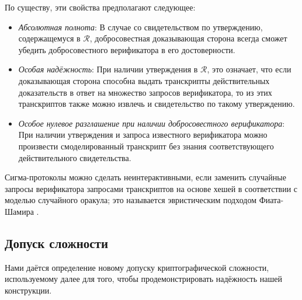 \documentclass{article}
\theoremstyle{definition}
\begin{document}
По существу, эти свойства предполагают следующее:
\begin{itemize}
\item \textit{Абсолютная полнота}: В случае со свидетельством по утверждению, содержащемуся в $\mathcal{R}$, добросовестная доказывающая сторона всегда сможет убедить добросовестного верификатора в его достоверности.
\item \textit{Особая надёжность}: При наличии утверждения в $\mathcal{R}$, это означает, что если доказывающая сторона способна выдать транскрипты действительных доказательств в ответ на множество запросов верификатора, то из этих транскриптов также можно извлечь и свидетельство по такому утверждению.
\item \textit{Особое нулевое разглашение при наличии добросовестного верификатора}: При наличии утверждения и запроса известного верификатора можно произвести смоделированный транскрипт без знания соответствующего действительного свидетельства.
\end{itemize}
Сигма-протоколы можно сделать неинтерактивными, если заменить случайные запросы верификатора запросами транскриптов на основе хешей в соответствии с моделью случайного оракула; это называется эвристическим подходом Фиата-Шамира \cite{fiat}.


\subsection{Допуск сложности}
Нами даётся определение новому допуску криптографической сложности, используемому далее для того, чтобы продемонстрировать надёжность нашей конструкции.
\end{document}
